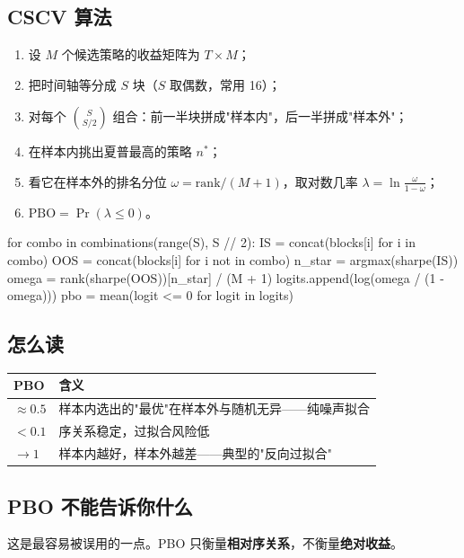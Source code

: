 \subsection{CSCV 算法}

\begin{enumerate}
  \item 设 $M$ 个候选策略的收益矩阵为 $T\times M$；
  \item 把时间轴等分成 $S$ 块（$S$ 取偶数，常用 16）；
  \item 对每个 $\binom{S}{S/2}$ 组合：前一半块拼成"样本内"，后一半拼成"样本外"；
  \item 在样本内挑出夏普最高的策略 $n^*$；
  \item 看它在样本外的排名分位 $\omega = \mathrm{rank}/(M+1)$，取对数几率
        $\lambda = \ln\frac{\omega}{1-\omega}$；
  \item $\mathrm{PBO} = \Pr(\lambda \le 0)$。
\end{enumerate}

\begin{pycode}
for combo in combinations(range(S), S // 2):
    IS  = concat(blocks[i] for i in combo)
    OOS = concat(blocks[i] for i not in combo)
    n_star = argmax(sharpe(IS))
    omega  = rank(sharpe(OOS))[n_star] / (M + 1)
    logits.append(log(omega / (1 - omega)))
pbo = mean(logit <= 0 for logit in logits)
\end{pycode}

\subsection{怎么读}

\begin{center}
\begin{tabular}{@{}ll@{}}
\toprule
PBO & 含义 \\
\midrule
$\approx 0.5$ & 样本内选出的"最优"在样本外与随机无异——纯噪声拟合 \\
$< 0.1$ & 序关系稳定，过拟合风险低 \\
$\rightarrow 1$ & 样本内越好，样本外越差——典型的"反向过拟合" \\
\bottomrule
\end{tabular}
\end{center}

\subsection{PBO 不能告诉你什么}

这是最容易被误用的一点。PBO 只衡量\textbf{相对序关系}，不衡量\textbf{绝对收益}。


